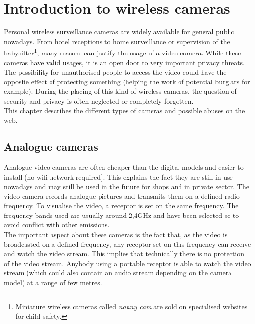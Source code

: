 
\chapter{Introduction to wireless cameras}
\label{chap:wifi-cam}


Personal wireless surveillance cameras are widely available for general public nowadays.
From hotel receptions to home surveillance or supervision of the babysitter\footnote{Miniature wireless cameras called \emph{nanny cam} are sold on specialised websites for child safety.}, many reasons can justify the usage of a video camera.
While these cameras have valid usages, it is an open door to very important privacy threats.
The possibility for unauthorised people to access the video could have the opposite effect of protecting something (helping the work of potential burglars for example).
During the placing of this kind of wireless cameras, the question of security and privacy is often neglected or completely forgotten.\\

This chapter describes the different types of cameras and possible abuses on the web.

\section{Analogue cameras}
\label{sec:cam-analogic}

Analogue video cameras are often cheaper than the digital models and easier to install (no wifi network required).
This explains the fact they are still in use nowadays and may still be used in the future for shops and in private sector.
The video camera records analogue pictures and transmits them on a defined radio frequency.
To visualise the video, a receptor is set on the same frequency.
The frequency bands used are usually around 2,4GHz and have been selected so to avoid conflict with other emissions.\\

The important aspect about these cameras is the fact that, as the video is broadcasted on a defined frequency, any receptor set on this frequency can receive and watch the video stream.
This implies that technically there is no protection of the video stream.
Anybody using a portable receptor is able to watch the video stream (which could also contain an audio stream depending on the camera model) at a range of few metres.\\

